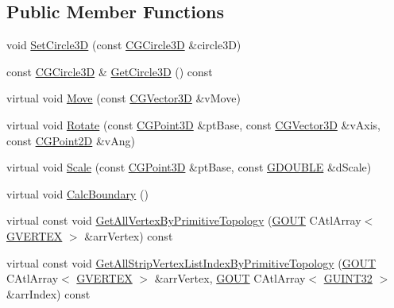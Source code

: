 \subsection*{Public Member Functions}
\begin{DoxyCompactItemize}
\item 
void \hyperlink{class_c_g_object_circle3_d_ae73a401a063d9e2f06b7eeddb702b3e7}{Set\+Circle3\+D} (const \hyperlink{class_c_g_circle3_d}{C\+G\+Circle3\+D} \&circle3\+D)
\item 
const \hyperlink{class_c_g_circle3_d}{C\+G\+Circle3\+D} \& \hyperlink{class_c_g_object_circle3_d_ad3824877aeb575df63835a75968ae077}{Get\+Circle3\+D} () const 
\item 
virtual void \hyperlink{class_c_g_object_circle3_d_ad283bf80b905eec0def587cfb7b4858b}{Move} (const \hyperlink{_g_point3_d_8h_aa7e73d39f4c991acb5a13c84b498366d}{C\+G\+Vector3\+D} \&v\+Move)
\item 
virtual void \hyperlink{class_c_g_object_circle3_d_ad6004f387709c910e1555e31f10e58ff}{Rotate} (const \hyperlink{class_c_g_point3_d}{C\+G\+Point3\+D} \&pt\+Base, const \hyperlink{_g_point3_d_8h_aa7e73d39f4c991acb5a13c84b498366d}{C\+G\+Vector3\+D} \&v\+Axis, const \hyperlink{class_c_g_point2_d}{C\+G\+Point2\+D} \&v\+Ang)
\item 
virtual void \hyperlink{class_c_g_object_circle3_d_a7b0b3d56ce0758bc2d3089ed31b00bb3}{Scale} (const \hyperlink{class_c_g_point3_d}{C\+G\+Point3\+D} \&pt\+Base, const \hyperlink{_g_types_8h_afd05ac85f90ee8e2a733928545462cd4}{G\+D\+O\+U\+B\+L\+E} \&d\+Scale)
\item 
virtual void \hyperlink{class_c_g_object_circle3_d_a0270510169659c02ce405afecc81cc78}{Calc\+Boundary} ()
\item 
virtual const void \hyperlink{class_c_g_object_circle3_d_a3cbb3d314e499234ac1fd57a256ed7f9}{Get\+All\+Vertex\+By\+Primitive\+Topology} (\hyperlink{_g_types_8h_a0858ec221262e635612871d70ca233ad}{G\+O\+U\+T} C\+Atl\+Array$<$ \hyperlink{struct_g_v_e_r_t_e_x}{G\+V\+E\+R\+T\+E\+X} $>$ \&arr\+Vertex) const 
\item 
virtual const void \hyperlink{class_c_g_object_circle3_d_ab5a9957942f141fcafedf8b7f4277456}{Get\+All\+Strip\+Vertex\+List\+Index\+By\+Primitive\+Topology} (\hyperlink{_g_types_8h_a0858ec221262e635612871d70ca233ad}{G\+O\+U\+T} C\+Atl\+Array$<$ \hyperlink{struct_g_v_e_r_t_e_x}{G\+V\+E\+R\+T\+E\+X} $>$ \&arr\+Vertex, \hyperlink{_g_types_8h_a0858ec221262e635612871d70ca233ad}{G\+O\+U\+T} C\+Atl\+Array$<$ \hyperlink{_g_types_8h_a2e1a1c77d1349057202e2f34e071019c}{G\+U\+I\+N\+T32} $>$ \&arr\+Index) const 

\end{DoxyCompactItemize}
